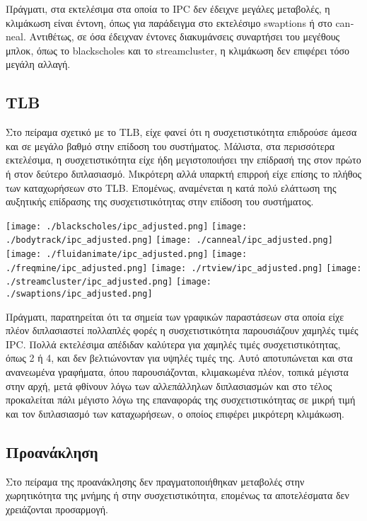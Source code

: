 \documentclass{article}
\newcommand{\eng}[1]{\foreignlanguage{english}{#1}}
\begin{document}
Πράγματι, στα εκτελέσιμα στα οποία το \eng{IPC} δεν έδειχνε μεγάλες μεταβολές, η κλιμάκωση είναι έντονη, όπως για παράδειγμα στο εκτελέσιμο \eng{swaptions} ή στο \eng{canneal}. Αντιθέτως, σε όσα έδειχναν έντονες διακυμάνσεις συναρτήσει του μεγέθους μπλοκ, όπως το \eng{blackscholes} και το \eng{streamcluster}, η κλιμάκωση δεν επιφέρει τόσο μεγάλη αλλαγή.  

\subsection{\eng{TLB}}

Στο πείραμα σχετικό με το \eng{TLB}, είχε φανεί ότι η συσχετιστικότητα επιδρούσε άμεσα και σε μεγάλο βαθμό στην επίδοση του συστήματος. Μάλιστα, στα περισσότερα εκτελέσιμα, η συσχετιστικότητα είχε ήδη μεγιστοποιήσει την επίδρασή της στον πρώτο ή στον δεύτερο διπλασιασμό. Μικρότερη αλλά υπαρκτή επιρροή είχε επίσης το πλήθος των καταχωρήσεων στο \eng{TLB}. Επομένως, αναμένεται η κατά πολύ ελάττωση της αυξητικής επίδρασης της συσχετιστικότητας στην επίδοση του συστήματος.

\graphicspath{{../parsec-3.0/parsec_workspace/outputs/exp3/}}
\begin{center}
    \texttt{[image: ./blackscholes/ipc\_adjusted.png]} 
    \texttt{[image: ./bodytrack/ipc\_adjusted.png]} 
    \texttt{[image: ./canneal/ipc\_adjusted.png]} 
    \texttt{[image: ./fluidanimate/ipc\_adjusted.png]} 
    \texttt{[image: ./freqmine/ipc\_adjusted.png]} 
    \texttt{[image: ./rtview/ipc\_adjusted.png]} 
    \texttt{[image: ./streamcluster/ipc\_adjusted.png]} 
    \texttt{[image: ./swaptions/ipc\_adjusted.png]} 
\end{center}
\FloatBarrier

Πράγματι, παρατηρείται ότι τα σημεία των γραφικών παραστάσεων στα οποία είχε πλέον διπλασιαστεί πολλαπλές φορές η συσχετιστικότητα παρουσιάζουν χαμηλές τιμές \eng{IPC}. Πολλά εκτελέσιμα απέδιδαν καλύτερα για χαμηλές τιμές συσχετιστικότητας, όπως 2 ή 4, και δεν βελτιώνονταν για υψηλές τιμές της. Αυτό αποτυπώνεται και στα ανανεωμένα γραφήματα, όπου παρουσιάζονται, κλιμακωμένα πλέον, τοπικά μέγιστα στην αρχή, μετά φθίνουν λόγω των αλλεπάλληλων διπλασιασμών και στο τέλος προκαλείται πάλι μέγιστο λόγω της επαναφοράς της συσχετιστικότητας σε μικρή τιμή και τον διπλασιασμό των καταχωρήσεων, ο οποίος επιφέρει μικρότερη κλιμάκωση.

\subsection{Προανάκληση}

Στο πείραμα της προανάκλησης δεν πραγματοποιήθηκαν μεταβολές στην χωρητικότητα της μνήμης ή στην συσχετιστικότητα, επομένως τα αποτελέσματα δεν χρειάζονται προσαρμογή.
\end{document}
